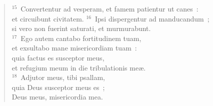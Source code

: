 \begin{verse}
${}^{15}$~Convertentur ad vesperam, et famem patientur ut canes~:\\ et circuibunt civitatem.
${}^{16}$~Ipsi dispergentur ad manducandum~;\\ si vero non fuerint saturati, et murmurabunt.\\
${}^{17}$~Ego autem cantabo fortitudinem tuam,\\ et exsultabo mane misericordiam tuam~:\\ quia factus es susceptor meus,\\ et refugium meum in die tribulationis me\ae .\\
${}^{18}$~Adjutor meus, tibi psallam,\\ quia Deus susceptor meus es~;\\ Deus meus, misericordia mea.\end{verse}



